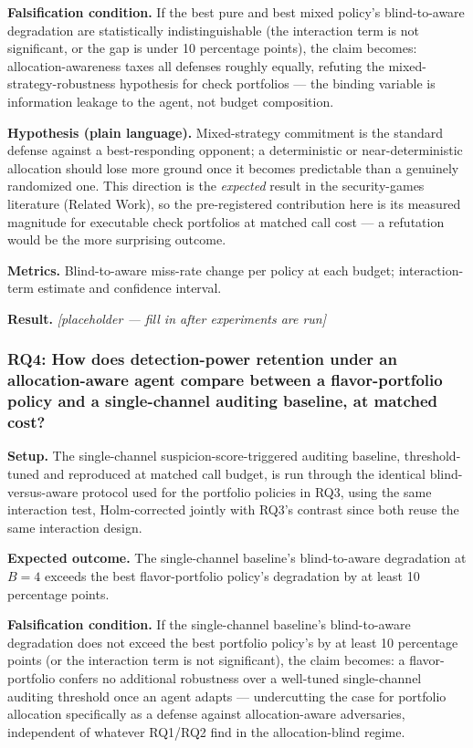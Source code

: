 \documentclass[11pt]{article}
\newcommand{\ph}{\textit{[placeholder --- fill in after experiments are run]}}
\begin{document}
\textbf{Falsification condition.} If the best pure and best mixed policy's blind-to-aware degradation are statistically indistinguishable (the interaction term is not significant, or the gap is under 10 percentage points), the claim becomes: allocation-awareness taxes all defenses roughly equally, refuting the mixed-strategy-robustness hypothesis for check portfolios --- the binding variable is information leakage to the agent, not budget composition.

\textbf{Hypothesis (plain language).} Mixed-strategy commitment is the standard defense against a best-responding opponent; a deterministic or near-deterministic allocation should lose more ground once it becomes predictable than a genuinely randomized one. This direction is the \emph{expected} result in the security-games literature (Related Work), so the pre-registered contribution here is its measured magnitude for executable check portfolios at matched call cost --- a refutation would be the more surprising outcome.

\textbf{Metrics.} Blind-to-aware miss-rate change per policy at each budget; interaction-term estimate and confidence interval.

\textbf{Result.} \ph

\subsubsection{RQ4: How does detection-power retention under an allocation-aware agent compare between a flavor-portfolio policy and a single-channel auditing baseline, at matched cost?}
\textbf{Setup.} The single-channel suspicion-score-triggered auditing baseline, threshold-tuned and reproduced at matched call budget, is run through the identical blind-versus-aware protocol used for the portfolio policies in RQ3, using the same interaction test, Holm-corrected jointly with RQ3's contrast since both reuse the same interaction design.

\textbf{Expected outcome.} The single-channel baseline's blind-to-aware degradation at $B=4$ exceeds the best flavor-portfolio policy's degradation by at least 10 percentage points.

\textbf{Falsification condition.} If the single-channel baseline's blind-to-aware degradation does not exceed the best portfolio policy's by at least 10 percentage points (or the interaction term is not significant), the claim becomes: a flavor-portfolio confers no additional robustness over a well-tuned single-channel auditing threshold once an agent adapts --- undercutting the case for portfolio allocation specifically as a defense against allocation-aware adversaries, independent of whatever RQ1/RQ2 find in the allocation-blind regime.
\end{document}
